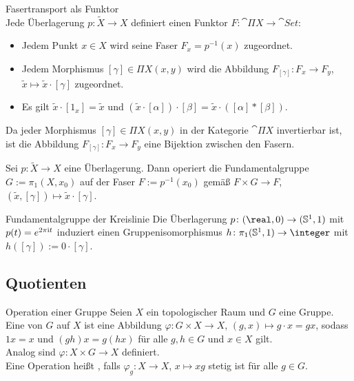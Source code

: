 \begin{Satz}{Fasertransport als Funktor}\\
    Jede Überlagerung $p\colon \widetilde{X} \rightarrow X$ definiert einen
    Funktor $F\colon \cat{\Pi X} \rightarrow \cat{Set}$:
    \begin{itemize}
        \item
        Jedem Punkt $x \in X$ wird seine Faser $F_x = p^{-1}(x)$ zugeordnet.

        \item
        Jedem Morphismus $[\gamma] \in \Pi X(x, y)$ wird die Abbildung
        $F_{[\gamma]}\colon F_x \rightarrow F_y$,
        $\widetilde{x} \mapsto \widetilde{x} \cdot [\gamma]$ zugeordnet.

        \item
        Es gilt $\widetilde{x} \cdot [1_x] = \widetilde{x}$ und
        $(\widetilde{x} \cdot [\alpha]) \cdot [\beta] =
        \widetilde{x} \cdot ([\alpha] \ast [\beta])$.
    \end{itemize}
    Da jeder Morphismus $[\gamma] \in \Pi X(x, y)$ in der Kategorie
    $\cat{\Pi X}$ invertierbar ist, ist die Abbildung
    $F_{[\gamma]}\colon F_x \rightarrow F_y$
    eine Bijektion zwischen den Fasern.
\end{Satz}

\begin{Kor}
    Sei $p\colon \widetilde{X} \rightarrow X$ eine Überlagerung.
    Dann operiert die Fundamentalgruppe \\
    $G := \pi_1(X, x_0)$ auf der
    Faser $F := p^{-1}(x_0)$ gemäß $F \times G \rightarrow F$,
    $(\widetilde{x}, [\gamma]) \mapsto \widetilde{x} \cdot [\gamma]$.
\end{Kor}

\linie

\begin{Satz}{Fundamentalgruppe der Kreislinie}
    Die Überlagerung $p\colon (\real, 0) \rightarrow (\sphere^1, 1)$ mit
    $p(t) = e^{2\pi\mathrm{i} t}$ induziert einen Gruppenisomorphismus
    $h\colon \pi_1(\sphere^1, 1) \rightarrow \integer$ mit
    $h([\gamma]) := 0 \cdot [\gamma]$.
\end{Satz}

\pagebreak

\subsection{%
    Quotienten%
}

\begin{Def}{Operation einer Gruppe}
    Seien $X$ ein topologischer Raum und $G$ eine Gruppe. \\
    Eine  von $G$ auf $X$ ist eine Abbildung
    $\varphi\colon G \times X \rightarrow X$, $(g, x) \mapsto g \cdot x = gx$,
    sodass $1x = x$ und $(gh)x = g(hx)$ für alle $g, h \in G$ und $x \in X$
    gilt. \\
    Analog sind 
    $\varphi\colon X \times G \rightarrow X$ definiert. \\
    Eine Operation heißt , falls
    $\varphi_g\colon X \rightarrow X$, $x \mapsto xg$ stetig ist
    für alle $g \in G$.
\end{Def}

